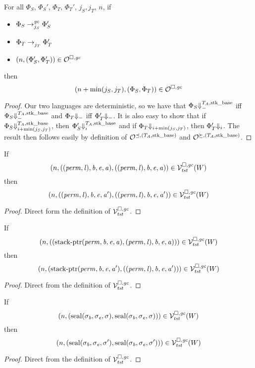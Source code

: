 \begin{lemma}
  \label{lem:lro-anti-red-gen}
  For all $\Phi_S$, $\Phi_S'$, $\Phi_T$, $\Phi_T'$, $j_S,j_T$, $n$, if
  \begin{itemize}
  \item $\Phi_S \nstep[j_S]{\gc} \Phi_S'$
  \item $\Phi_T \nstep[j_T]{} \Phi_T'$
  \item $\npair{(\Phi_S',\Phi_T')} \in \lro$
  \end{itemize}
  then
  \[
    \npair[n+\min(j_S,j_T)]{(\Phi_S,\Phi_T)} \in \lro
  \]
\end{lemma}
\begin{proof}
  Our two languages are deterministic, so we have that $\Phi_S \sterm{\ta,\stkb}$ iff $\Phi_S \sterm{\ta,\stkb}$ and $\Phi_T \term$ iff $\Phi_T' \term$.
  It is also easy to show that if $\Phi_S \sterm[i + \min(j_S,j_T)]{\ta,\stkb}$, then $\Phi_S' \sterm[i]{\ta,\stkb}$ and if $\Phi_T \term[i+\min(j_S,j_T)]$, then $\Phi_T' \term[i]$.
  The result then follows easily by definition of $\lrol$ and $\lror$.
\end{proof}

\begin{lemma}
  \label{lem:cap-in-lrv-regardless-of-addr}
  If
  \[
    \npair{((\perm,\lin),\baddr,\eaddr,\aaddr),((\perm,\lin),\baddr,\eaddr,\aaddr)} \in \lrvg{\trust}(W)
  \]
  then
  \[
    \npair{((\perm,\lin),\baddr,\eaddr,\aaddr'),((\perm,\lin),\baddr,\eaddr,\aaddr')} \in \lrvg{\trust}(W)
  \]
\end{lemma}
\begin{proof}
  Direct form the definition of $\lrvg{\trust}$.
\end{proof}

\begin{lemma}
\label{lem:stkptr-in-lrv-regardless-of-addr}
  If
  \[
    \npair{((\stkptr{\perm,\baddr,\eaddr,\aaddr},(\perm,\lin),\baddr,\eaddr,\aaddr))} \in \lrvg{\trust}(W)
  \]
  then
  \[
    \npair{(\stkptr{\perm,\baddr,\eaddr,\aaddr'},((\perm,\lin),\baddr,\eaddr,\aaddr'))} \in \lrvg{\trust}(W)
  \]
\end{lemma}
\begin{proof}
  Direct from the definition of $\lrvg{\trust}$.
\end{proof}

\begin{lemma}
  \label{lem:seal-in-lrv-regardless-of-cur-seal}
  If
  \[
    \npair{(\seal{\sigma_\baddr,\sigma_\eaddr,\sigma},\seal{\sigma_\baddr,\sigma_\eaddr,\sigma})} \in \lrvg{\trust}(W)
  \]
  then
  \[
    \npair{(\seal{\sigma_\baddr,\sigma_\eaddr,\sigma'},\seal{\sigma_\baddr,\sigma_\eaddr,\sigma'})} \in \lrvg{\trust}(W)
  \]
\end{lemma}
\begin{proof}
  Direct from the definition of $\lrvg{\trust}$.
\end{proof}


